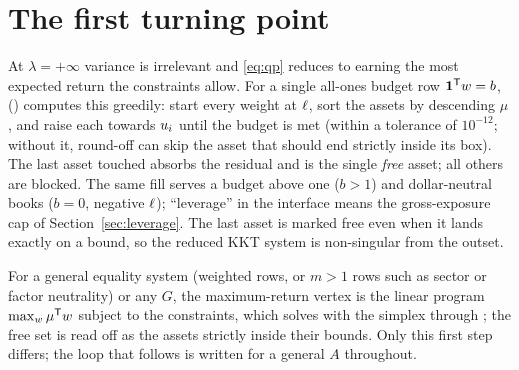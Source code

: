 \section{The first turning point}
\label{sec:first}

At $\lambda = +\infty$ variance is irrelevant and \eqref{eq:qp} reduces to earning the
most expected return the constraints allow. For a single all-ones budget row
$\mathbf{1}^{\mathsf{T}} w = b$, 
() computes this greedily: start every weight at
$\ell$, sort the assets by descending $\mu$, and raise each towards $u_i$ until the
budget is met (within a tolerance of $10^{-12}$; without it, round-off can skip the
asset that should end strictly inside its box). The last asset touched absorbs the residual and is the
single \emph{free} asset; all others are blocked. The same fill serves a budget
above one ($b > 1$) and dollar-neutral books ($b = 0$, negative $\ell$); ``leverage'' in
the interface means the gross-exposure cap of Section~\ref{sec:leverage}. The last asset is marked
free even when it lands exactly on a bound, so the reduced KKT system is non-singular
from the outset.

For a general equality system (weighted rows, or $m > 1$ rows such as sector or factor
neutrality) or any $G$, the maximum-return vertex is the linear program
$\max_w \mu^{\mathsf{T}} w$ subject to the constraints, which  solves with the
 simplex through ; the free set is read off as the
assets strictly inside their bounds. Only this first step differs; the loop that
follows is written for a general $A$ throughout.

